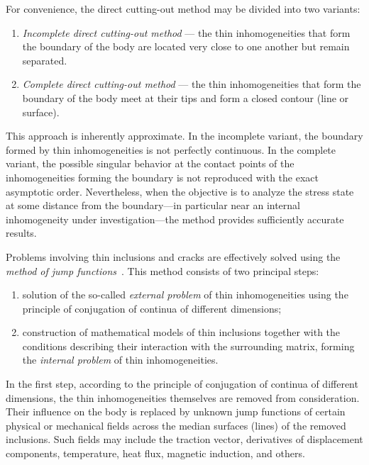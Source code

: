 For convenience, the direct cutting-out method may be divided into two variants:

\begin{enumerate}
	\item \emph{Incomplete direct cutting-out method} --- the thin inhomogeneities that form the boundary of the body are located very close to one another but remain separated.
	
	\item \emph{Complete direct cutting-out method} --- the thin inhomogeneities that form the boundary of the body meet at their tips and form a closed contour (line or surface).
\end{enumerate}

This approach is inherently approximate. In the incomplete variant, the boundary formed by thin inhomogeneities is not perfectly continuous. In the complete variant, the possible singular behavior at the contact points of the inhomogeneities forming the boundary is not reproduced with the exact asymptotic order. Nevertheless, when the objective is to analyze the stress state at some distance from the boundary---in particular near an internal inhomogeneity under investigation---the method provides sufficiently accurate results.

Problems involving thin inclusions and cracks are effectively solved using the \emph{method of jump functions}~\cite{Vasilev25}. This method consists of two principal steps:

\begin{enumerate}
	\item solution of the so-called \emph{external problem} of thin inhomogeneities using the principle of conjugation of continua of different dimensions;
	
	\item construction of mathematical models of thin inclusions together with the conditions describing their interaction with the surrounding matrix, forming the \emph{internal problem} of thin inhomogeneities.
\end{enumerate}

In the first step, according to the principle of conjugation of continua of different dimensions, the thin inhomogeneities themselves are removed from consideration. Their influence on the body is replaced by unknown jump functions of certain physical or mechanical fields across the median surfaces (lines) of the removed inclusions. Such fields may include the traction vector, derivatives of displacement components, temperature, heat flux, magnetic induction, and others.

